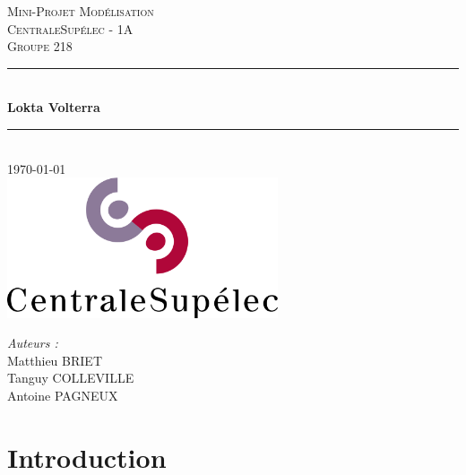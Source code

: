 \documentclass[a4paper, 11pt]{report}%
\begin{document}
    \begin{titlepage}
        \newcommand{\HRule}{\rule{\linewidth}{0.5mm}}
        \begin{center}
            \textsc{\LARGE{} Mini-Projet Modélisation} \\[0.5cm] 
            \textsc{\Large{} CentraleSupélec - 1A} \\[0.5cm]
            \textsc{\large{} Groupe 218} \\[0.5cm] 
            \HRule \\[0.6cm]
            {\huge\bfseries{} Lokta Volterra} \\[0.25cm]
            \HRule \\[1.5cm]
            {\large\today} \\[2cm] 
            \includegraphics[width=8cm]{images/cs.png}
            \\[2cm] 
        \end{center}
        \vfill{}
        \begin{minipage}{0.45\linewidth}
            \begin{flushleft}
                \Large\textit{Auteurs :} \\
                Matthieu \textsc{BRIET} \\
                Tanguy \textsc{COLLEVILLE} \\
                Antoine \textsc{PAGNEUX} 
            \end{flushleft}
        \end{minipage}
    \end{titlepage}

    \tableofcontents
    \listoffigures

    \newpage
    \section{Introduction}
\end{document}
